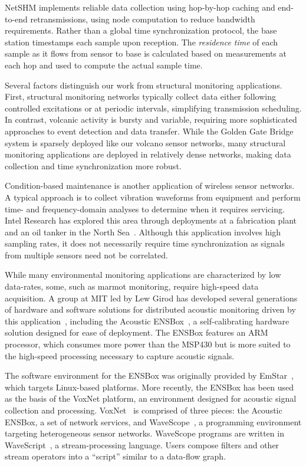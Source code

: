 NetSHM implements reliable data collection using hop-by-hop caching and
end-to-end retransmissions, using node computation to reduce bandwidth
requirements. Rather than a global time synchronization protocol, the base
station timestamps each sample upon reception. The \textit{residence time} of
each sample as it flows from sensor to base is calculated based on
measurements at each hop and used to compute the actual sample time.

Several factors distinguish our work from structural monitoring applications.
First, structural monitoring networks typically collect data either following
controlled excitations or at periodic intervals, simplifying transmission
scheduling. In contrast, volcanic activity is bursty and variable, requiring
more sophisticated approaches to event detection and data transfer. While the
Golden Gate Bridge system is sparsely deployed like our volcano sensor
networks, many structural monitoring applications are deployed in relatively
dense networks, making data collection and time synchronization more robust. 

Condition-based maintenance is another application of wireless sensor
networks. A typical approach is to collect vibration waveforms from equipment
and perform time- and frequency-domain analyses to determine when it requires
servicing. Intel Research has explored this area through deployments at a
fabrication plant and an oil tanker in the North
Sea~\cite{intel-northseasensys}. Although this application involves high
sampling rates, it does not necessarily require time synchronization as
signals from multiple sensors need not be correlated. 

While many environmental monitoring applications are characterized by low
data-rates, some, such as marmot monitoring, require high-speed data
acquisition. A group at MIT led by Lew Girod has developed several
generations of hardware and software solutions for distributed acoustic
monitoring driven by this application~\cite{girod-marmots}, including the
Acoustic ENSBox~\cite{girod-ensbox}, a self-calibrating hardware solution
designed for ease of deployment. The ENSBox features an ARM processor, which
consumes more power than the MSP430 but is more suited to the high-speed
processing necessary to capture acoustic signals.

The software environment for the ENSBox was originally provided by
EmStar~\cite{emstar}, which targets Linux-based platforms. More recently, the
ENSBox has been used as the basis of the VoxNet platform, an environment
designed for acoustic signal collection and processing.
VoxNet~\cite{voxnet-ipsn08} is comprised of three pieces: the Acoustic
ENSBox, a set of network services, and WaveScope~\cite{wavescope}, a
programming environment targeting heterogeneous sensor networks. WaveScope
programs are written in WaveScript~\cite{wavescript-techreport08}, a
stream-processing language. Users compose filters and other stream operators
into a ``script'' similar to a data-flow graph.

